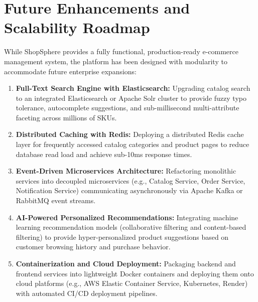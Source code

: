 \section{Future Enhancements and Scalability Roadmap}
While ShopSphere provides a fully functional, production-ready e-commerce management system, the platform has been designed with modularity to accommodate future enterprise expansions:
\begin{enumerate}[leftmargin=2.0em]
    \item \textbf{Full-Text Search Engine with Elasticsearch:} Upgrading catalog search to an integrated Elasticsearch or Apache Solr cluster to provide fuzzy typo tolerance, autocomplete suggestions, and sub-millisecond multi-attribute faceting across millions of SKUs.
    \item \textbf{Distributed Caching with Redis:} Deploying a distributed Redis cache layer for frequently accessed catalog categories and product pages to reduce database read load and achieve sub-10ms response times.
    \item \textbf{Event-Driven Microservices Architecture:} Refactoring monolithic services into decoupled microservices (e.g., Catalog Service, Order Service, Notification Service) communicating asynchronously via Apache Kafka or RabbitMQ event streams.
    \item \textbf{AI-Powered Personalized Recommendations:} Integrating machine learning recommendation models (collaborative filtering and content-based filtering) to provide hyper-personalized product suggestions based on customer browsing history and purchase behavior.
    \item \textbf{Containerization and Cloud Deployment:} Packaging backend and frontend services into lightweight Docker containers and deploying them onto cloud platforms (e.g., AWS Elastic Container Service, Kubernetes, Render) with automated CI/CD deployment pipelines.
\end{enumerate}
